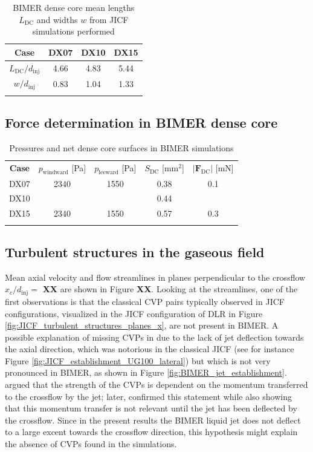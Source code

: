 \begin{table}[!h]
\centering
\caption{BIMER dense core mean lengths $L_\mathrm{DC}$ and widths $w$ from JICF simulations performed}
\begin{tabular}{cccc}
\thickhline
\textbf{Case} &  DX07 & DX10 & DX15  \\
\hline
$L_\mathrm{DC}/d_\mathrm{inj}$ & 4.66 & 4.83 & 5.44  \\
$w/d_\mathrm{inj}$ & 0.83 & 1.04 & 1.33  \\
\thickhline
\end{tabular}
\label{tab:BIMER_L_DC_values}
\end{table}


\subsection{Force determination in BIMER dense core}


\begin{table}[!h]
\centering
\caption{Pressures and net dense core surfaces in BIMER simulations}
\begin{tabular}{ccccc}
\thickhline
\textbf{Case} & $p_\mathrm{windward}$ [Pa] & $p_\mathrm{leeward}$ [Pa] & $S_\mathrm{DC}$ [mm$^2$]& $|\boldsymbol{F}_\mathrm{DC}|$ [mN] \\
\thickhline 
DX07  & 2340 & 1550 & 0.38 & 0.1 \\
DX10  &  & & 0.44 & \\
DX15 & 2340 & 1550 & 0.57 & 0.3 \\
\thickhline
\end{tabular}
\label{tab:BIMER_dense_core_pressures_and_force_parameters}
\end{table}

\subsection{Turbulent structures in the gaseous field}

Mean axial velocity and flow streamlines in planes perpendicular to the crossflow $x_c/d_\mathrm{inj} =$ \textbf{XX} are shown in Figure \textbf{XX}. Looking at the streamlines, one of the first observations is that the classical CVP pairs typically observed in JICF configurations, visualized in the JICF configuration of DLR in Figure \ref{fig:JICF_turbulent_structures_planes_x}, are not present in BIMER. A possible explanation of missing CVPs in due to the lack of jet deflection towards the axial direction, which was notorious in the classical JICF (see for instance Figure \ref{fig:JICF_establishment_UG100_lateral}) but which is not very pronounced in BIMER, as shown in Figure \ref{fig:BIMER_jet_establishment}.  argued that the strength of the CVPs is dependent on the momentum transferred to the crossflow by the jet; later,  confirmed this statement while also showing that this momentum transfer is not relevant until the jet has been deflected by the crossflow. Since in the present results the BIMER liquid jet does not deflect to a large excent towards the crossflow direction, this hypothesis might explain the absence of CVPs found in the simulations.

